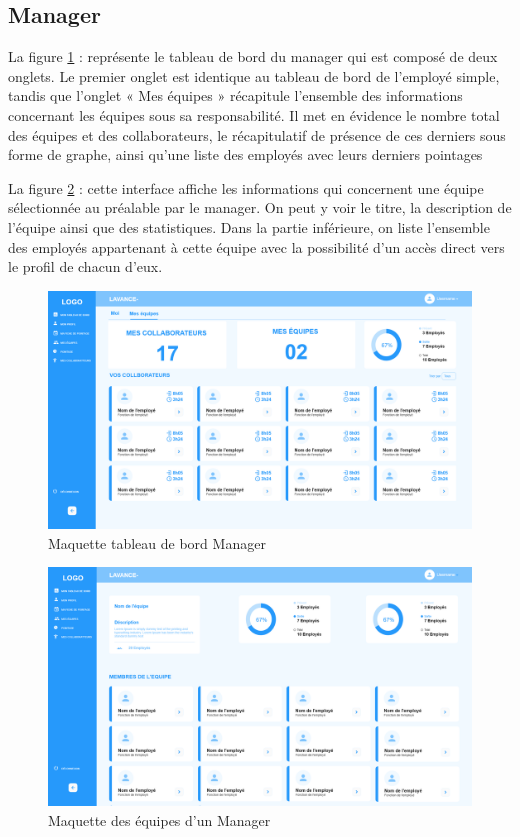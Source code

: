 \subsection{Manager}
La figure \ref{fig8} : représente le tableau de bord du manager qui est
composé de deux onglets. Le premier onglet est identique au tableau de bord de
l’employé simple, tandis que l’onglet « Mes équipes » récapitule l’ensemble des
informations concernant les équipes sous sa responsabilité. Il met
en évidence le nombre total des équipes et des collaborateurs, le récapitulatif
de présence de ces derniers sous forme de graphe, ainsi qu’une liste des
employés avec leurs derniers pointages
        
La figure \ref{fig9} : cette interface affiche les informations qui concernent
une équipe sélectionnée au préalable par le manager. On peut y voir le titre, la
description de l’équipe ainsi que des statistiques. Dans la partie inférieure,
on liste l’ensemble des employés appartenant à cette équipe avec la possibilité
d’un accès direct vers le profil de chacun d’eux.

\begin{figure}[h!]
    \centering
    \includegraphics[width=18cm]{images/dash_man_my_teams.png}
    \caption{Maquette tableau de bord Manager}
    \label{fig8}
\end{figure}

\clearpage

\begin{figure}[h!]
    \centering
    \includegraphics[width=18cm]{images/my_team.png}
    \caption{Maquette des équipes d'un Manager}
    \label{fig9}
\end{figure}


